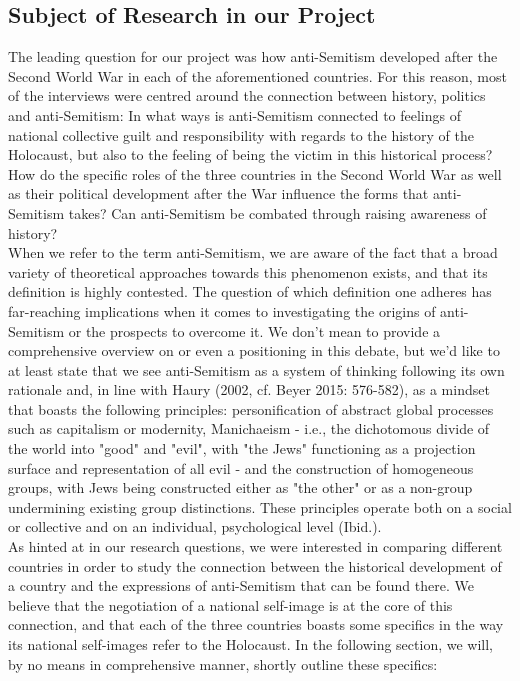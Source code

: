 \subsection*{Subject of Research in our Project}
The leading question for our project was how anti-Semitism developed after the Second World War in each of the aforementioned countries. For this reason, most of the interviews were centred around the connection between history, politics and anti-Semitism: In what ways is anti-Semitism connected to feelings of national collective guilt and responsibility with regards to the history of the Holocaust, but also to the feeling of being the victim in this historical process? How do the specific roles of the three countries in the Second World War as well as their political development after the War influence the forms that anti-Semitism takes? Can anti-Semitism be combated through raising awareness of history? \\
When we refer to the term anti-Semitism, we are aware of the fact that a broad variety of theoretical approaches towards this phenomenon exists, and that its definition is highly contested. The question of which definition one adheres has far-reaching implications when it comes to investigating the origins of anti-Semitism or the prospects to overcome it. We don't mean to provide a comprehensive overview on or even a positioning in this debate, but we'd like to at least state that we see anti-Semitism as a system of thinking following its own rationale and, in line with Haury (2002, cf. Beyer 2015: 576-582), as a mindset that boasts the following principles: personification of abstract global processes such as capitalism or modernity, Manichaeism - i.e., the dichotomous divide of the world into "good" and "evil", with "the Jews" functioning as a projection surface and representation of all evil - and the construction of homogeneous groups, with Jews being constructed either as "the other" or as a non-group undermining existing group distinctions. These principles operate both on a social or collective and on an individual, psychological level (Ibid.).\\
 As hinted at in our research questions, we were interested in comparing different countries in order to study the connection between the historical development of a country and the expressions of anti-Semitism that can be found there. We believe that the negotiation of a national self-image is at the core of this connection, and that each of the three countries boasts some specifics in the way its national self-images refer to the Holocaust. In the following section, we will, by no means in comprehensive manner, shortly outline these specifics: \par

